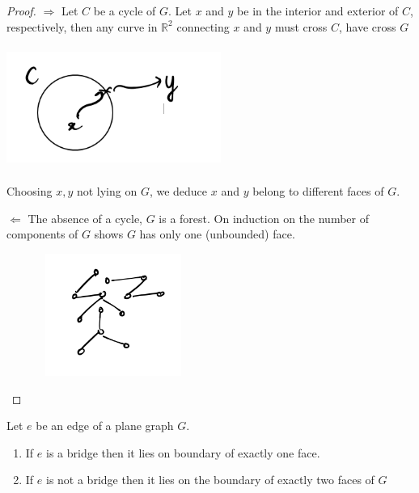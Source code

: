\documentclass[12pt]{article}
\newenvironment{lemma}[1]{
  \renewcommand\thecustomlemma{#1}\customlemma
}{\endcustomlemma}
\begin{document}
\begin{proof}
	$\Rightarrow$ Let $C$ be a cycle of $G$. Let $x$ and $y$ be in the interior and exterior of $C$, respectively, then any curve in $\mathbb{R}^{2}$ connecting $x$ and $y$ must cross $C$, have cross $G$

	\begin{center}
		\includegraphics[width=7cm,height=4cm]{circle_proof}
	\end{center}

	Choosing $x, y$ not lying on $G$, we deduce $x$ and $y$ belong to different faces of $G$.

	$\Leftarrow$ The absence of a cycle, $G$ is a forest. On induction on the number of components of $G$ shows $G$ has only one (unbounded) face.

	\begin{center}
		\includegraphics[width=7cm,height=4cm]{circle_proof2}
	\end{center}

\end{proof}



\begin{lemma}{3}
	Let $e$ be an edge of a plane graph $G$.
	\begin{enumerate}
		\item If $e$ is a bridge then it lies on boundary of exactly one face.
		\item If $e$ is not a bridge then it lies on the boundary of exactly two faces of $G$
	\end{enumerate}
\end{lemma}
\end{document}
